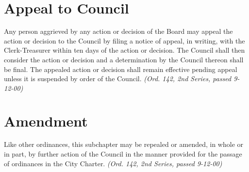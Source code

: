 \section{Appeal to Council}
Any person aggrieved by any action or decision of the Board may appeal the action or decision to the Council by filing a notice of appeal, in writing, with the Clerk-Treasurer within ten days of the action or decision.  The Council shall then consider the action or decision and a determination by the Council thereon shall be final.  The appealed action or decision shall remain effective pending appeal unless it is suspended by order of the Council.\newline
\emph{(Ord. 142, 2nd Series, passed 9-12-00)}
\section{Amendment}
Like other ordinances, this subchapter may be repealed or amended, in whole or in part, by further action of the Council in the manner provided for the passage of ordinances in the City Charter.\newline
\emph{(Ord. 142, 2nd Series, passed 9-12-00)}

%
